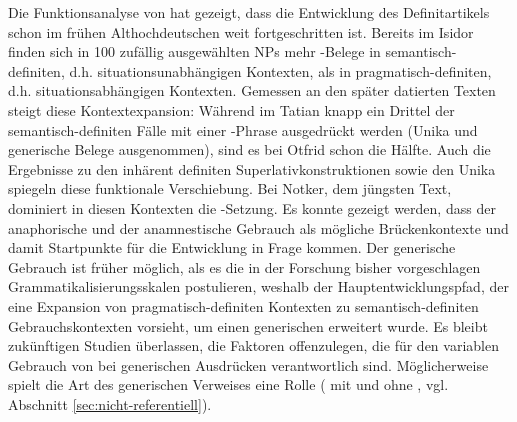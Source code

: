 Die Funktionsanalyse von  hat gezeigt, dass die Entwicklung des Definitartikels schon im frühen Althochdeutschen weit fortgeschritten ist. Bereits im Isidor finden sich in 100 zufällig ausgewählten NPs mehr -Belege in semantisch-definiten, d.h. situationsunabhängigen Kontexten, als in pragmatisch-definiten, d.h. situationsabhängigen Kontexten. Gemessen an den später datierten Texten steigt diese Kontextexpansion: Während im Tatian knapp ein Drittel der se\-man\-tisch-definiten Fälle mit einer -Phrase ausgedrückt werden (Unika und generische Belege ausgenommen), sind es bei Otfrid schon die Hälfte. Auch die Ergebnisse zu den inhärent definiten Superlativkonstruktionen sowie den Unika spiegeln diese funktionale Verschiebung. Bei Notker, dem jüngsten Text, dominiert in diesen Kontexten die -Setzung. Es konnte gezeigt werden, dass der anaphorische und der anamnestische Gebrauch als mögliche Brückenkontexte und damit Startpunkte für die Entwicklung in Frage kommen. Der generische Gebrauch ist früher möglich, als es die in der Forschung bisher vorgeschlagen Grammatikalisierungsskalen postulieren, weshalb der Hauptentwicklungspfad, der eine Expansion von pragmatisch-definiten Kontexten zu semantisch-definiten Gebrauchskontexten vorsieht, um einen generischen  erweitert wurde. Es bleibt zukünftigen Studien überlassen, die Faktoren offenzulegen, die für den variablen Gebrauch von  bei generischen Ausdrücken verantwortlich sind. Möglicherweise spielt die Art des generischen Verweises eine Rolle ( mit und ohne , vgl. Abschnitt \ref{sec:nicht-referentiell}). 

